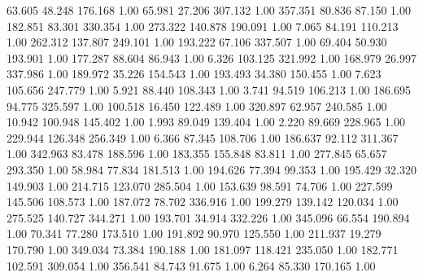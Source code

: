   63.605   48.248  176.168         1.00
  65.981   27.206  307.132         1.00
 357.351   80.836   87.150         1.00
 182.851   83.301  330.354         1.00
 273.322  140.878  190.091         1.00
   7.065   84.191  110.213         1.00
 262.312  137.807  249.101         1.00
 193.222   67.106  337.507         1.00
  69.404   50.930  193.901         1.00
 177.287   88.604   86.943         1.00
   6.326  103.125  321.992         1.00
 168.979   26.997  337.986         1.00
 189.972   35.226  154.543         1.00
 193.493   34.380  150.455         1.00
   7.623  105.656  247.779         1.00
   5.921   88.440  108.343         1.00
   3.741   94.519  106.213         1.00
 186.695   94.775  325.597         1.00
 100.518   16.450  122.489         1.00
 320.897   62.957  240.585         1.00
  10.942  100.948  145.402         1.00
   1.993   89.049  139.404         1.00
   2.220   89.669  228.965         1.00
 229.944  126.348  256.349         1.00
   6.366   87.345  108.706         1.00
 186.637   92.112  311.367         1.00
 342.963   83.478  188.596         1.00
 183.355  155.848   83.811         1.00
 277.845   65.657  293.350         1.00
  58.984   77.834  181.513         1.00
 194.626   77.394   99.353         1.00
 195.429   32.320  149.903         1.00
 214.715  123.070  285.504         1.00
 153.639   98.591   74.706         1.00
 227.599  145.506  108.573         1.00
 187.072   78.702  336.916         1.00
 199.279  139.142  120.034         1.00
 275.525  140.727  344.271         1.00
 193.701   34.914  332.226         1.00
 345.096   66.554  190.894         1.00
  70.341   77.280  173.510         1.00
 191.892   90.970  125.550         1.00
 211.937   19.279  170.790         1.00
 349.034   73.384  190.188         1.00
 181.097  118.421  235.050         1.00
 182.771  102.591  309.054         1.00
 356.541   84.743   91.675         1.00
   6.264   85.330  170.165         1.00
